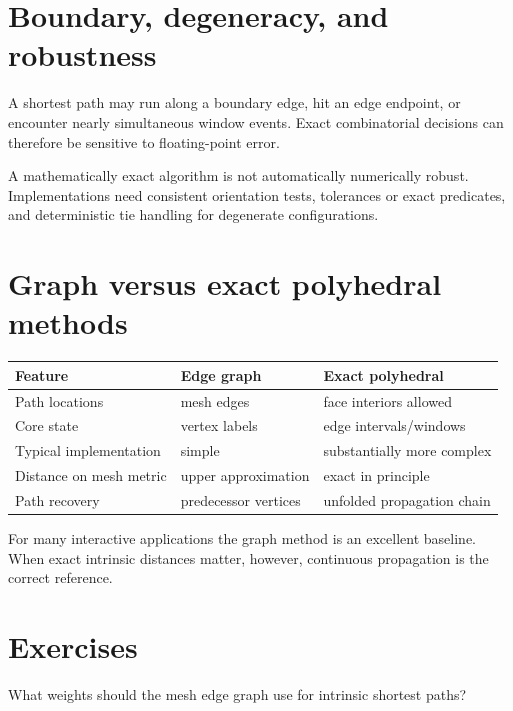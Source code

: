 \section{Boundary, degeneracy, and robustness}

A shortest path may run along a boundary edge, hit an edge endpoint, or encounter
nearly simultaneous window events.  Exact combinatorial decisions can therefore
be sensitive to floating-point error.

\begin{warning}\label{warn:vii39-robust}
A mathematically exact algorithm is not automatically numerically robust.
Implementations need consistent orientation tests, tolerances or exact
predicates, and deterministic tie handling for degenerate configurations.
\end{warning}

\section{Graph versus exact polyhedral methods}

\begin{center}
\begin{tabular}{lll}
\toprule
Feature & Edge graph & Exact polyhedral \\
\midrule
Path locations & mesh edges & face interiors allowed \\
Core state & vertex labels & edge intervals/windows \\
Typical implementation & simple & substantially more complex \\
Distance on mesh metric & upper approximation & exact in principle \\
Path recovery & predecessor vertices & unfolded propagation chain \\
\bottomrule
\end{tabular}
\end{center}

For many interactive applications the graph method is an excellent baseline.
When exact intrinsic distances matter, however, continuous propagation is the
correct reference.

\section{Exercises}

\begin{exercise}\label{exr:vii39-01}
What weights should the mesh edge graph use for intrinsic shortest paths?
\end{exercise}

